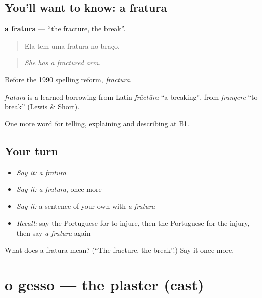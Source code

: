 \subsection*{You'll want to know: a fratura}
\textbf{a fratura} — \textquotedblleft{}the fracture, the break\textquotedblright{}.

\begin{quote}
Ela tem uma fratura no braço.
\end{quote}

\begin{quote}
\emph{She has a fractured arm.}
\end{quote}

Before the 1990 spelling reform, \emph{fractura}.

\begin{cousinweb}
\emph{fratura} is a learned borrowing from Latin \emph{frāctūra} \textquotedblleft{}a breaking\textquotedblright{}, from \emph{frangere} \textquotedblleft{}to break\textquotedblright{} (Lewis \& Short).
\end{cousinweb}

\begin{grammarlens}[title={What you've built}]
One more word for telling, explaining and describing at B1.
\end{grammarlens}

\subsection*{Your turn}
\begin{itemize}
\raggedright
  \item \emph{Say it:} \emph{a fratura}
  \item \emph{Say it:} \emph{a fratura}, once more
  \item \emph{Say it:} a sentence of your own with \emph{a fratura}
  \item \emph{Recall:} say the Portuguese for to injure, then the Portuguese for the injury, then say \emph{a fratura} again
\end{itemize}

\begin{tcolorbox}[breakable,colback=teal!4,colframe=teal!35!black,title={Before you move on}]
What does a fratura mean? (\textquotedblleft{}The fracture, the break\textquotedblright{}.) Say it once more.
\end{tcolorbox}
\section[o gesso]{o gesso — the plaster (cast)}


